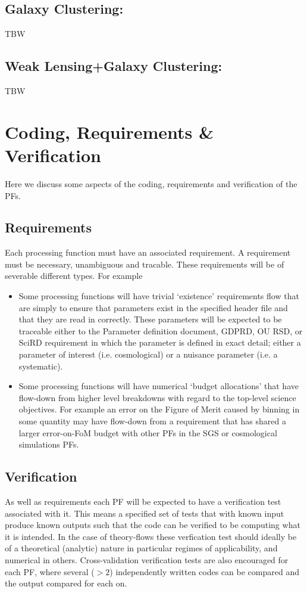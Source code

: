 \subsection{Galaxy Clustering: } 
TBW

\subsection{Weak Lensing+Galaxy Clustering: }
TBW 

\section{Coding, Requirements \& Verification} 
Here we discuss some aspects of the coding, requirements and verification of the PFs. 

\subsection{Requirements} 
Each processing function must have an associated requirement. A requirement 
must be necessary, unambiguous and tracable. These requirements will be of severable different types. For example 
\begin{itemize} 
\item 
Some processing functions will have trivial `existence' requirements flow that are simply to ensure that parameters 
exist in the specified header file and that they are read in correctly. These parameters will be expected to be traceable 
either to the Parameter definition document, GDPRD, OU RSD, or SciRD requirement in which the parameter is defined 
in exact detail; either a parameter of interest (i.e. cosmological) or a nuisance parameter (i.e. a systematic). 
\item 
Some processing functions will have numerical `budget allocations' that have flow-down from higher level breakdowns 
with regard to the top-level science objectives. For example an error on the Figure of Merit caused by binning in 
some quantity may have flow-down from a requirement that has shared a larger error-on-FoM budget with other 
PFs in the SGS or cosmological simulations PFs. 
\end{itemize} 

\subsection{Verification}
As well as requirements each PF will be expected to have a verification test associated with it. This means a specified 
set of tests that with known input produce known outputs such that the code can be verified to be computing what it 
is intended. In the case of theory-flows these verfication test should ideally be of a theoretical (analytic) nature 
in particular regimes of applicability, and numerical in others. 
Cross-validation verification tests are also encouraged for each PF, where several ($>2$) independently written 
codes can be compared and the output compared for each on. 

